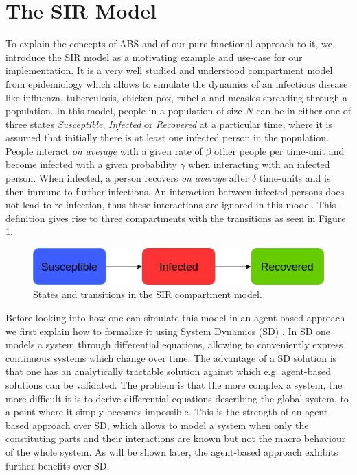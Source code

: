 \section{The SIR Model}
\label{sec:sir_model}
To explain the concepts of ABS and of our pure functional approach to it, we introduce the SIR model as a motivating example and use-case for our implementation. It is a very well studied and understood compartment model from epidemiology \cite{kermack_contribution_1927} which allows to simulate the dynamics of an infectious disease like influenza, tuberculosis, chicken pox, rubella and measles \cite{enns_its_2010} spreading through a population. In this model, people in a population of size $N$ can be in either one of three states \textit{Susceptible}, \textit{Infected} or \textit{Recovered} at a particular time, where it is assumed that initially there is at least one infected person in the population. People interact \textit{on average} with a given rate of $\beta$ other people per time-unit and become infected with a given probability $\gamma$ when interacting with an infected person. When infected, a person recovers \textit{on average} after $\delta$ time-units and is then immune to further infections. An interaction between infected persons does not lead to re-infection, thus these interactions are ignored in this model. This definition gives rise to three compartments with the transitions as seen in Figure \ref{fig:sir_transitions}.

\begin{figure}
	\centering
	\includegraphics[width=.4\textwidth, angle=0]{./fig/diagrams/SIR_transitions.png}
	\caption{States and transitions in the SIR compartment model.}
	\label{fig:sir_transitions}
\end{figure}

Before looking into how one can simulate this model in an agent-based approach we first explain how to formalize it using System Dynamics (SD) \cite{porter_industrial_1962}. In SD one models a system through differential equations, allowing to conveniently express continuous systems which change over time. The advantage of a SD solution is that one has an analytically tractable solution against which e.g. agent-based solutions can be validated. The problem is that the more complex a system, the more difficult it is to derive differential equations describing the global system, to a point where it simply becomes impossible. This is the strength of an agent-based approach over SD, which allows to model a system when only the constituting parts and their interactions are known but not the macro behaviour of the whole system. As will be shown later, the agent-based approach exhibits further benefits over SD.

